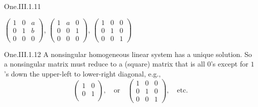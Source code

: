 \begin{ans}{One.III.1.11}
\begin{exparts}
          $\begin{pmatrix}
               1  &0  &a  \\
               0  &1  &b  \\
               0  &0  &0
             \end{pmatrix}$,
          $\begin{pmatrix}
               1  &a  &0  \\
               0  &0  &1  \\
               0  &0  &0
             \end{pmatrix}$,
          $\begin{pmatrix}
               1  &0  &0  \\
               0  &1  &0  \\
               0  &0  &1
             \end{pmatrix}$
      \end{exparts}
    
\end{ans}
\begin{ans}{One.III.1.12}
      A nonsingular homogeneous linear system has a unique solution.
      So a nonsingular matrix must reduce to a (square)
      matrix that is all \( 0 \)'s
      except for \( 1 \)'s down the upper-left to lower-right diagonal, e.g.,
      \begin{equation*}
         \begin{pmatrix}
           1  &0  \\
           0  &1  \\
         \end{pmatrix},
         \quad\text{or}\quad
         \begin{pmatrix}
           1  &0  &0  \\
           0  &1  &0  \\
           0  &0  &1
         \end{pmatrix},
         \quad\text{etc.}
      \end{equation*}
    
\end{ans}
